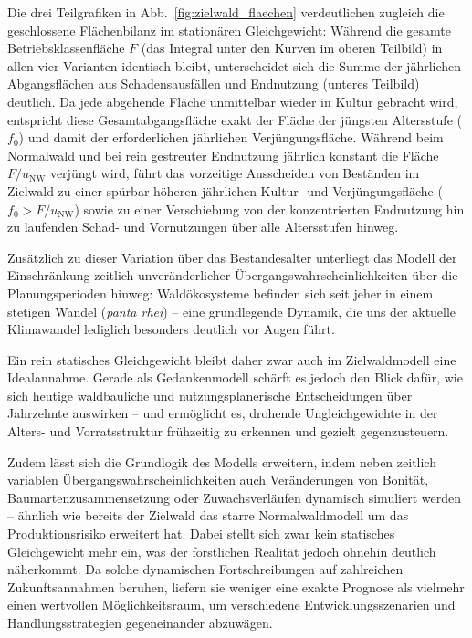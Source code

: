\documentclass[twocolumn, paper=a4, fontsize=10pt]{scrartcl}
\begin{document}
Die drei Teilgrafiken in Abb.~\ref{fig:zielwald_flaechen} verdeutlichen zugleich die geschlossene Flächenbilanz im stationären Gleichgewicht: Während die gesamte Betriebsklassenfläche $F$ (das Integral unter den Kurven im oberen Teilbild) in allen vier Varianten identisch bleibt, unterscheidet sich die Summe der jährlichen Abgangsflächen aus Schadensausfällen und Endnutzung (unteres Teilbild) deutlich. Da jede abgehende Fläche unmittelbar wieder in Kultur gebracht wird, entspricht diese Gesamtabgangsfläche exakt der Fläche der jüngsten Altersstufe ($f_0$) und damit der erforderlichen jährlichen Verjüngungsfläche. Während beim Normalwald und bei rein gestreuter Endnutzung jährlich konstant die Fläche $F/u_{\text{NW}}$ verjüngt wird, führt das vorzeitige Ausscheiden von Beständen im Zielwald zu einer spürbar höheren jährlichen Kultur- und Verjüngungsfläche ($f_0 > F/u_{\text{NW}}$) sowie zu einer Verschiebung von der konzentrierten Endnutzung hin zu laufenden Schad- und Vornutzungen über alle Altersstufen hinweg.

Zusätzlich zu dieser Variation über das Bestandesalter unterliegt das Modell der Einschränkung zeitlich unveränderlicher Übergangswahrscheinlichkeiten über die Planungsperioden hinweg: Waldökosysteme befinden sich seit jeher in einem stetigen Wandel (\emph{panta rhei}) -- eine grundlegende Dynamik, die uns der aktuelle Klimawandel lediglich besonders deutlich vor Augen führt.

Ein rein statisches Gleichgewicht bleibt daher zwar auch im Zielwaldmodell eine Idealannahme. Gerade als Gedankenmodell schärft es jedoch den Blick dafür, wie sich heutige waldbauliche und nutzungsplanerische Entscheidungen über Jahrzehnte auswirken -- und ermöglicht es, drohende Ungleichgewichte in der Alters- und Vorratsstruktur frühzeitig zu erkennen und gezielt gegenzusteuern.

Zudem lässt sich die Grundlogik des Modells erweitern, indem neben zeitlich variablen Übergangswahrscheinlichkeiten auch Veränderungen von Bonität, Baumartenzusammensetzung oder Zuwachsverläufen dynamisch simuliert werden -- ähnlich wie bereits der Zielwald das starre Normalwaldmodell um das Produktionsrisiko erweitert hat. Dabei stellt sich zwar kein statisches Gleichgewicht mehr ein, was der forstlichen Realität jedoch ohnehin deutlich näherkommt. Da solche dynamischen Fortschreibungen auf zahlreichen Zukunftsannahmen beruhen, liefern sie weniger eine exakte Prognose als vielmehr einen wertvollen Möglichkeitsraum, um verschiedene Entwicklungsszenarien und Handlungsstrategien gegeneinander abzuwägen.
\end{document}

